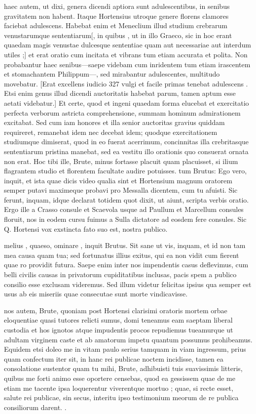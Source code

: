  haec autem, ut dixi, genera dicendi aptiora sunt adulescentibus, in senibus gravitatem non habent. Itaque Hortensius utroque genere florens clamores faciebat adulescens. Habebat enim et Meneclium illud studium crebrarum venustarumque sententiarum[, in quibus , ut in illo Graeco, sic in hoc erant quaedam magis venustae dulcesque sententiae quam aut necessariae aut interdum utiles ;] et erat oratio cum incitata et vibrans tum etiam accurata et polita. Non probabantur haec senibus—saepe videbam cum inridentem tum etiam irascentem et stomachantem Philippum—, sed mirabantur adulescentes, multitudo movebatur. [Erat excellens iudicio 327 vulgi et facile primas tenebat adulescens . Etsi enim genus illud dicendi auctoritatis habebat parum, tamen aptum esse aetati videbatur.] Et certe, quod et ingeni quaedam forma elucebat et exercitatio perfecta verborum astricta comprehensione, summam hominum admirationem excitabat. Sed cum iam honores et illa senior auctoritas gravius quiddam requireret, remanebat idem nec decebat idem; quodque exercitationem studiumque dimiserat, quod in eo fuerat acerrimum, concinnitas illa crebritasque sententiarum pristina manebat, sed ea vestitu illo orationis quo consuerat ornata non erat. Hoc tibi ille, Brute, minus fortasse placuit quam placuisset, si ilium flagrantem studio et florentem facultate audire potuisses. tum Brutus: Ego vero, inquit, et ista quae dicis video qualia sint et Hortensium magnum oratorem semper putavi maximeque probavi pro Messalla dicentem, cum tu afuisti. Sic ferunt, inquam, idque declarat totidem quot dixit, ut aiunt, scripta verbis oratio. Ergo ille a Crasso consule et Scaevola usque ad Paullum et Marcellum consules floruit, nos in eodem cursu fuimus a Sulla dictatore ad eosdem fere consules. Sic Q. Hortensi vox exstincta fato suo est, nostra publico.

 melius , quaeso, ominare , inquit Brutus. Sit sane ut vis, inquam, et id non tam mea causa quam tua; sed fortunatus illius exitus, qui ea non vidit cum fierent quae ro providit futura. Saepe enim inter nos impendentis casus deflevimus, cum belli civilis causas in privatorum cupiditatibus inclusas, pacis spem a publico consilio esse exclusam videremus. Sed illum videtur felicitas ipsius qua semper est usus ab eis miseriis quae consecutae sunt morte vindicavisse.

 nos autem, Brute, quoniam post Hortensi clarisimi oratoris mortem orbae eloquentiae quasi tutores relicti sumus, domi teneamus eam saeptam liberal custodia et hos ignotos atque impudentis procos repudiemus tueamurque ut adultam virginem caste et ab amatorum impetu quantum possumus prohibeamus. Equidem etsi doleo me in vitam paulo serius tamquam in viam ingressum, prius quam confectum iter sit, in hanc rei publicae noctem incidisse, tamen ea consolatione sustentor quam tu mihi, Brute, adhibuisti tuis suavissimis litteris, quibus me forti animo esse oportere censebas, quod ea gessissem quae de me etiam me tacente ipsa loquerentur viverentque mortuo ; quae, si recte esset, salute rei publicae, sin secus, interitu ipso testimonium meorum de re publica consiliorum darent. .

